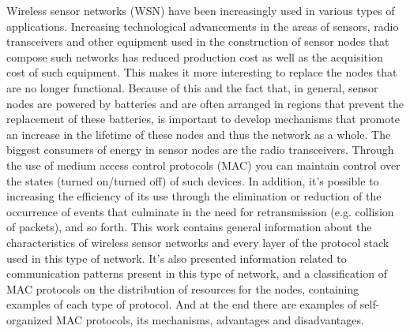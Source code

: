 \documentclass{uflamon}          %
\begin{document}
{Wireless sensor networks (WSN) have been increasingly used in various types of applications. Increasing technological advancements in the areas of sensors, radio transceivers and other equipment used in the construction of sensor nodes that compose such networks has reduced production cost as well as the acquisition cost of such equipment. This makes it more interesting to replace the nodes that are no longer functional. Because of this and the fact that, in general, sensor nodes are powered by batteries and are often arranged in regions that prevent the replacement of these batteries, is important to develop mechanisms that promote an increase in the lifetime of these nodes and thus the network as a whole. The biggest consumers of energy in sensor nodes are the radio transceivers. Through the use of medium access control protocols (MAC) you can maintain control over the states (turned on/turned off) of such devices. In addition, it's possible to increasing the efficiency of its use through the elimination or reduction of the occurrence of events that culminate in the need for retransmission (e.g. collision of packets), and so forth. This work contains general information about the characteristics of wireless sensor networks and every layer of the protocol stack used in this type of network. It's also presented information related to communication patterns present in this type of network, and a classification of MAC protocols on the distribution of resources for the nodes, containing examples of each type of protocol. And at the end there are examples of self-organized MAC protocols, its mechanisms, advantages and disadvantages.}                         %

\clearpage












\appendix
% 

\end{document}

